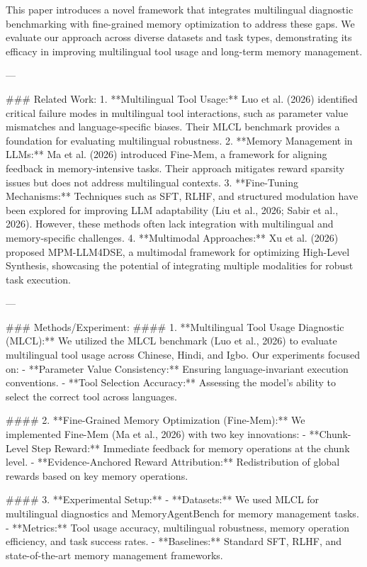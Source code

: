 This paper introduces a novel framework that integrates multilingual diagnostic benchmarking with fine-grained memory optimization to address these gaps. We evaluate our approach across diverse datasets and task types, demonstrating its efficacy in improving multilingual tool usage and long-term memory management.

---

### Related Work:
1. **Multilingual Tool Usage:** Luo et al. (2026) identified critical failure modes in multilingual tool interactions, such as parameter value mismatches and language-specific biases. Their MLCL benchmark provides a foundation for evaluating multilingual robustness.
2. **Memory Management in LLMs:** Ma et al. (2026) introduced Fine-Mem, a framework for aligning feedback in memory-intensive tasks. Their approach mitigates reward sparsity issues but does not address multilingual contexts.
3. **Fine-Tuning Mechanisms:** Techniques such as SFT, RLHF, and structured modulation have been explored for improving LLM adaptability (Liu et al., 2026; Sabir et al., 2026). However, these methods often lack integration with multilingual and memory-specific challenges.
4. **Multimodal Approaches:** Xu et al. (2026) proposed MPM-LLM4DSE, a multimodal framework for optimizing High-Level Synthesis, showcasing the potential of integrating multiple modalities for robust task execution.

---

### Methods/Experiment:
#### 1. **Multilingual Tool Usage Diagnostic (MLCL):**
We utilized the MLCL benchmark (Luo et al., 2026) to evaluate multilingual tool usage across Chinese, Hindi, and Igbo. Our experiments focused on:
- **Parameter Value Consistency:** Ensuring language-invariant execution conventions.
- **Tool Selection Accuracy:** Assessing the model’s ability to select the correct tool across languages.

#### 2. **Fine-Grained Memory Optimization (Fine-Mem):**
We implemented Fine-Mem (Ma et al., 2026) with two key innovations:
- **Chunk-Level Step Reward:** Immediate feedback for memory operations at the chunk level.
- **Evidence-Anchored Reward Attribution:** Redistribution of global rewards based on key memory operations.

#### 3. **Experimental Setup:**
- **Datasets:** We used MLCL for multilingual diagnostics and MemoryAgentBench for memory management tasks.
- **Metrics:** Tool usage accuracy, multilingual robustness, memory operation efficiency, and task success rates.
- **Baselines:** Standard SFT, RLHF, and state-of-the-art memory management frameworks.

